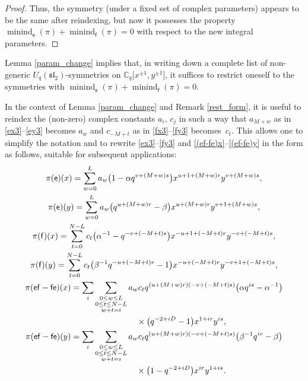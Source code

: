 \documentclass[pdftex]{sigma}
\numberwithin{equation}{section}
\begin{document}
\begin{proof}
Thus, the symmetry (under a fixed set of complex parameters) appears to be the same after reindexing, but now it possesses the property $\operatorname{minind}_\mathsf{e}(\pi)+
\operatorname{minind}_\mathsf{f}(\pi)=0$ with respect to the new integral parameters.
\end{proof}

\begin{Remark}\label{rest_form}Lemma \ref{param_change} implies that, in writing down a complete list of non-generic $U_q(\mathfrak{sl}_2)$-symmetries on $\mathbb{C}_q\big[x^{\pm 1},y^{\pm 1}\big]$, it suffices to restrict oneself to the symmetries with $\operatorname{minind}_\mathsf{e}(\pi)+\operatorname{minind}_\mathsf{f}(\pi)=0$.
\end{Remark}

\begin{Remark}
In the context of Lemma \ref{param_change} and Remark \ref{rest_form}, it is useful to reindex the (non-zero) complex constants $a_i$, $c_j$ in such a way that $a_{M+w}$ as in \eqref{ex3}--\eqref{ey3} becomes $a_w$ and $c_{-M+t}$ as in \eqref{fx3}--\eqref{fy3} becomes~$c_t$. This allows one to simplify the notation and to rewrite \eqref{ex3}--\eqref{fy3} and \eqref{(ef-fe)x}--\eqref{(ef-fe)y} in the form as follows, suitable for subsequent applications:
\begin{gather}
\pi(\mathsf{e})(x) =\sum_{w=0}^La_w\big(1-\alpha q^{v+(M+w)s}\big)x^{u+1+(M+w)r}y^{v+(M+w)s},\label{ex6}\\
 \pi(\mathsf{e})(y) =\sum_{w=0}^La_w\big(q^{u+(M+w)r}-\beta\big)x^{u+(M+w)r}y^{v+1+(M+w)s},\label{ey6}\\
\pi(\mathsf{f})(x) =\sum_{t=0}^{N-L}c_t\big(\alpha^{-1}-q^{-v+(-M+t)s}\big)x^{-u+1+(-M+t)r}y^{-v+(-M+t)s}, \label{fx6}\\
\pi(\mathsf{f})(y) =\sum_{t=0}^{N-L}c_t\big(\beta^{-1}q^{-u+(-M+t)r}-1\big)x^{-u+(-M+t)r}y^{-v+1+(-M+t)s}, \label{fy6}\\
\pi(\mathsf{ef-fe})(x) =\sum_i\sum_{\substack{0\le w\le L\\ 0\le t\le N-L\\ w+t=i}}a_wc_tq^{(u+(M+w)r)(-v+(-M+t)s)}\big(\alpha q^{is}-\alpha^{-1}\big)\nonumber\\
\hphantom{\pi(\mathsf{ef-fe})(x) =}{}\times \big(q^{-2+iD}-1\big) x^{1+ir}y^{is}, \label{(ef-fe)x2}\\
 \pi(\mathsf{ef-fe})(y) =\sum_i\sum_{\substack{0\le w\le L\\ 0\le t\le N-L\\ w+t=i}}a_wc_tq^{(u+(M+w)r)(-v+(-M+t)s)}\big(\beta^{-1}q^{ir}-\beta\big)\nonumber\\
 \hphantom{\pi(\mathsf{ef-fe})(y) =}{}\times \big(1-q^{-2+iD}\big) x^{ir}y^{1+is}. \label{(ef-fe)y2}
\end{gather}
\end{Remark}
\end{document}
